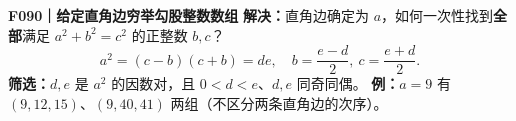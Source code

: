\textbf{F090｜给定直角边穷举勾股整数数组}
\textbf{解决：}直角边确定为 $a$，如何一次性找到\textbf{全部}满足 $a^2+b^2=c^2$ 的正整数 $b,c$？
\[\boxed{a^2=(c-b)(c+b)=de},\quad\boxed{b=\frac{e-d}{2},\ c=\frac{e+d}{2}}.\]
\textbf{筛选：}$d,e$ 是 $a^2$ 的因数对，且 $0<d<e$、$d,e$ 同奇同偶。
\textbf{例：}$a=9$ 有 $(9,12,15)$、$(9,40,41)$ 两组（不区分两条直角边的次序）。

